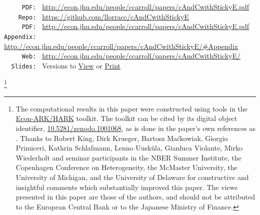 \documentclass[titlepage]{\econtex}
\begin{document}
\begin{adjustwidth}{-1em}{-1em}
\parbox{\textwidth}{
  \begin{center}
\begin{tabbing}
  \texttt{~~~~~PDF:~} \= \= \url{http://econ.jhu.edu/people/ccarroll/papers/cAndCwithStickyE.pdf} \kill \\  
\texttt{~~~~Repo:~} \= \= \url{https://github.com/llorracc/cAndCwithStickyE}  \\
\texttt{~~~~~PDF:~} \> \> \url{http://econ.jhu.edu/people/ccarroll/papers/cAndCwithStickyE.pdf} \\
\texttt{Appendix:~} \> \> \url{http://econ.jhu.edu/people/ccarroll/papers/cAndCwithStickyE/\#Appendix} \\
\texttt{~~~~~Web:~} \> \> \url{http://econ.jhu.edu/people/ccarroll/papers/cAndCwithStickyE/} \\
\texttt{~~Slides:~} \> \> Versions to \href{http://econ.jhu.edu/people/ccarroll/papers/cAndCwithStickyE-Slides.pdf}{View} or \href{http://econ.jhu.edu/people/ccarroll/papers/cAndCwithStickyE-Slides-Print.pdf}{Print} \\
\end{tabbing}
\end{center}
}

\begin{authorsinfo}
\end{authorsinfo}
\thanks{The computational results in this paper were constructed using tools in the \href{http://github.com/Econ-ARK/HARK}{Econ-ARK/HARK} toolkit.  The toolkit can be cited by its digital object identifier, \href{https://doi.org/10.5281/zenodo.1001068}{10.5281/zenodo.1001068}, as is done in the paper's own references as \cite{matthew_n_white_2017_1001068}.  Thanks to Robert King, Dirk Krueger, Bartosz Ma\'ckowiak, Giorgio Primiceri, Kathrin Schlafmann, Lenno Uusk\"ula, Gianluca Violante, Mirko Wiederholt and seminar participants in the NBER Summer Institute, the Copenhagen Conference on Heterogeneity, the McMaster University, the University of Michigan, and the University of Delaware for constructive and insightful comments which substantially improved this paper. The views presented in this paper are those of the authors, and should not be attributed to the European Central Bank or to the Japanese Ministry of Finance.}

\titlepagefinish
\setcounter{page}{1}
\end{adjustwidth}
\end{document}
